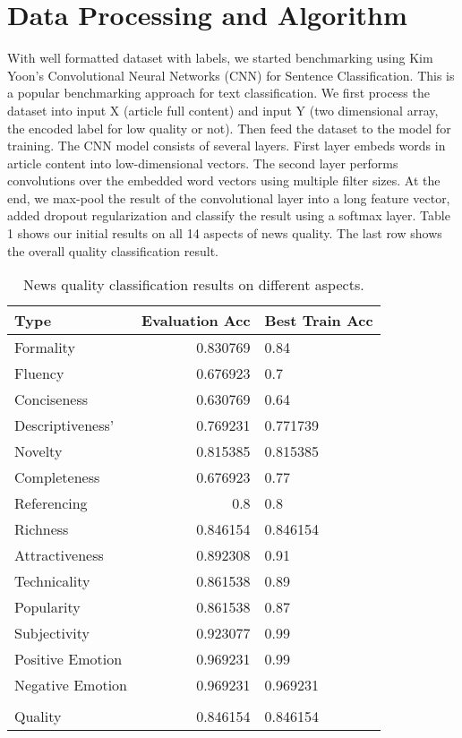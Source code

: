 \documentclass[11pt]{article}
\begin{document}
\section{Data Processing and Algorithm}

With well formatted dataset with labels, we started benchmarking using Kim Yoon’s Convolutional Neural Networks (CNN) for Sentence Classification. This is a popular benchmarking approach for text classification. We first process the dataset into input X (article full content) and input Y (two dimensional array, the encoded label for low quality or not). Then feed the dataset to the model for training. The CNN model consists of several layers. First layer embeds words in article content into low-dimensional vectors. The second layer performs convolutions over the embedded word vectors using multiple filter sizes. At the end, we max-pool the result of the convolutional layer into a long feature vector, added dropout regularization and classify the result using a softmax layer.  Table 1 shows our initial results on all 14 aspects of news quality. The last row shows the overall quality classification result. 


\begin{table}[h]
\begin{center}
\begin{tabular}{|l|rl|}
\hline \bf Type & \bf Evaluation Acc & \bf Best Train Acc \\ \hline
Formality & 0.830769 & 0.84 \\
Fluency & 0.676923 & 0.7 \\
Conciseness & 0.630769 & 0.64 \\
Descriptiveness' & 0.769231 & 0.771739 \\
Novelty& 0.815385 & 0.815385 \\
Completeness & 0.676923  & 0.77\\
Referencing & 0.8 & 0.8 \\
Richness & 0.846154 & 0.846154 \\
Attractiveness & 0.892308 & 0.91 \\
Technicality & 0.861538 & 0.89 \\
Popularity & 0.861538 & 0.87 \\
Subjectivity & 0.923077 & 0.99 \\
Positive Emotion & 0.969231 & 0.99 \\
Negative Emotion & 0.969231 & 0.969231 \\
 &  &  \\
Quality & 0.846154 & 0.846154 \\
\hline
\end{tabular}
\end{center}
\caption{\label{font-table} News quality classification results on different aspects. }
\end{table}
\end{document}
